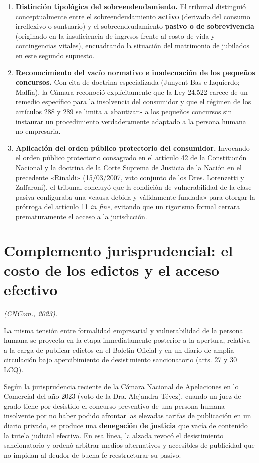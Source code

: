 \documentclass[12pt,oneside]{book}
\begin{document}
\begin{enumerate}[label=\alph*)]
    \item \textbf{Distinción tipológica del sobreendeudamiento.} El tribunal distinguió conceptualmente entre el sobreendeudamiento \textbf{activo} (derivado del consumo irreflexivo o suntuario) y el sobreendeudamiento \textbf{pasivo o de sobrevivencia} (originado en la insuficiencia de ingresos frente al costo de vida y contingencias vitales), encuadrando la situación del matrimonio de jubilados en este segundo supuesto.
    \item \textbf{Reconocimiento del vacío normativo e inadecuación de los pequeños concursos.} Con cita de doctrina especializada (Junyent Bas e Izquierdo; Maffía), la Cámara reconoció explícitamente que la Ley 24.522 carece de un remedio específico para la insolvencia del consumidor y que el régimen de los artículos 288 y 289 se limita a «bautizar» a los pequeños concursos sin instaurar un procedimiento verdaderamente adaptado a la persona humana no empresaria.
    \item \textbf{Aplicación del orden público protectorio del consumidor.} Invocando el orden público protectorio consagrado en el artículo 42 de la Constitución Nacional y la doctrina de la Corte Suprema de Justicia de la Nación en el precedente «Rinaldi» (15/03/2007, voto conjunto de los Dres. Lorenzetti y Zaffaroni), el tribunal concluyó que la condición de vulnerabilidad de la clase pasiva configuraba una «causa debida y válidamente fundada» para otorgar la prórroga del artículo 11 \textit{in fine}, evitando que un rigorismo formal cerrara prematuramente el acceso a la jurisdicción.
\end{enumerate}

\section{Complemento jurisprudencial: el costo de los edictos y el acceso efectivo}

\textit{(CNCom., 2023).}

La misma tensión entre formalidad empresarial y vulnerabilidad de la persona humana se proyecta en la etapa inmediatamente posterior a la apertura, relativa a la carga de publicar edictos en el Boletín Oficial y en un diario de amplia circulación bajo apercibimiento de desistimiento sancionatorio (arts. 27 y 30 LCQ).

Según la jurisprudencia reciente de la Cámara Nacional de Apelaciones en lo Comercial del año 2023 (voto de la Dra. Alejandra Tévez), cuando un juez de grado tiene por desistido el concurso preventivo de una persona humana insolvente por no haber podido afrontar las elevadas tarifas de publicación en un diario privado, se produce una \textbf{denegación de justicia} que vacía de contenido la tutela judicial efectiva. En esa línea, la alzada revocó el desistimiento sancionatorio y ordenó arbitrar medios alternativos y accesibles de publicidad que no impidan al deudor de buena fe reestructurar su pasivo.
\end{document}
